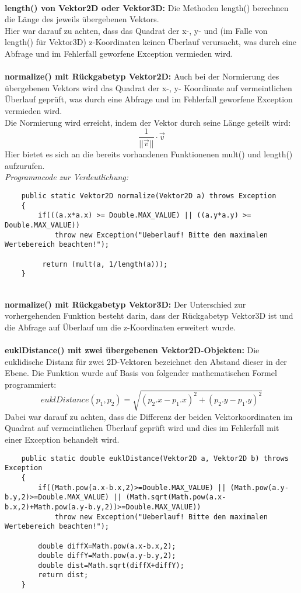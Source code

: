 \documentclass[a4paper,11pt]{scrartcl}
\begin{document}
\\
\textbf{length() von Vektor2D oder Vektor3D: } Die Methoden length() berechnen die Länge des jeweils übergebenen Vektors.\\
Hier war darauf zu achten, dass das Quadrat der x-, y- und (im Falle von length() für Vektor3D) z-Koordinaten keinen Überlauf verursacht, was durch eine Abfrage und im Fehlerfall geworfene Exception vermieden wird.\\
\\
\textbf{normalize() mit Rückgabetyp Vektor2D: } Auch bei der Normierung des übergebenen Vektors wird das Quadrat der x-, y- Koordinate auf vermeintlichen Überlauf geprüft, was durch eine Abfrage und im Fehlerfall geworfene Exception vermieden wird.\\
Die Normierung wird erreicht, indem der Vektor durch seine Länge geteilt wird:
\[ \frac{1}{||\vec v||} \cdot \vec v \]
Hier bietet es sich an die bereits vorhandenen Funktionenen mult() und length() aufzurufen.\\
\textit{Programmcode zur Verdeutlichung:}
\begin{lstlisting}
	public static Vektor2D normalize(Vektor2D a) throws Exception
	{
		if(((a.x*a.x) >= Double.MAX_VALUE) || ((a.y*a.y) >= Double.MAX_VALUE))
			throw new Exception("Ueberlauf! Bitte den maximalen Wertebereich beachten!");
		
		 return (mult(a, 1/length(a)));
	}
\end{lstlisting} $\;$ \\
\\
\textbf{normalize() mit Rückgabetyp Vektor3D:} Der Unterschied zur vorhergehenden Funktion besteht darin, dass der Rückgabetyp Vektor3D ist und die Abfrage auf Überlauf um die z-Koordinaten erweitert wurde.\\
\\
\textbf{euklDistance() mit zwei übergebenen Vektor2D-Objekten:} Die euklidische Distanz für zwei 2D-Vektoren bezeichnet den Abstand dieser in der Ebene. Die Funktion wurde auf Basis von folgender mathematischen Formel programmiert:
\[ euklDistance(p_1,p_2) = \sqrt{(p_2.x - p_1.x)^2 + (p_2.y - p_1.y)^2} \]
Dabei war darauf zu achten, dass die Differenz der beiden Vektorkoordinaten im Quadrat auf vermeintlichen Überlauf geprüft wird und dies im Fehlerfall mit einer Exception behandelt wird.
\begin{lstlisting}
	public static double euklDistance(Vektor2D a, Vektor2D b) throws Exception
	{
		if((Math.pow(a.x-b.x,2)>=Double.MAX_VALUE) || (Math.pow(a.y-b.y,2)>=Double.MAX_VALUE) || (Math.sqrt(Math.pow(a.x-b.x,2)+Math.pow(a.y-b.y,2))>=Double.MAX_VALUE))
			throw new Exception("Ueberlauf! Bitte den maximalen Wertebereich beachten!");
		
		double diffX=Math.pow(a.x-b.x,2);
		double diffY=Math.pow(a.y-b.y,2);
		double dist=Math.sqrt(diffX+diffY);
		return dist;
	}
\end{lstlisting} $\;$ \\
\end{document}
